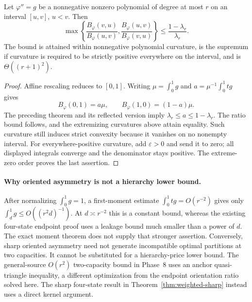 \begin{theorem}
Let $\varphi''=g$ be a nonnegative nonzero polynomial of degree at most
$r$ on an interval $[u,v]$, $u<v$. Then
\begin{equation}
 \max\left\{\frac{B_\varphi(v,u)}{B_\varphi(u,v)},
             \frac{B_\varphi(u,v)}{B_\varphi(v,u)}\right\}
 \le\frac{1-\lambda_r}{\lambda_r}.
 \label{eq:p9-exact-asymmetry}
\end{equation}
The bound is attained within nonnegative polynomial curvature, is the
supremum if curvature is required to be strictly positive everywhere on
the interval, and is $\Theta((r+1)^2)$.
\end{theorem}
\begin{proof}
Affine rescaling reduces to $[0,1]$. Writing
$\mu=\int_0^1g$ and $a=\mu^{-1}\int_0^1tg$ gives
\[
 B_\varphi(0,1)=a\mu,
 \qquad B_\varphi(1,0)=(1-a)\mu.
\]
The preceding theorem and its reflected version imply
$\lambda_r\le a\le1-\lambda_r$. The ratio bound follows, and the
extremizing curvatures above attain equality. Such curvature still
induces strict convexity because it vanishes on no nonempty interval.
For everywhere-positive curvature, add $\varepsilon>0$ and send it to
zero; all displayed integrals converge and the denominator stays positive.
The extreme-zero order proves the last assertion.
\end{proof}

\paragraph{Why oriented asymmetry is not a hierarchy lower bound.}
After normalizing $\int_0^1g=1$, a first-moment estimate
$\int_0^1tg=O(r^{-2})$ gives only
$\int_d^1g\le O((r^2d)^{-1})$. At $d\asymp r^{-2}$ this is a
constant bound, whereas the existing four-state endpoint proof uses a
leakage bound much smaller than a power of $d$. The exact moment theorem
does not supply that stronger assertion. Conversely, sharp oriented
asymmetry need not generate incompatible optimal partitions at two
capacities. It cannot be substituted for a hierarchy-price lower bound.
The general-source $O(r^2)$ two-capacity bound in Phase~8 uses an anchor
quasi-triangle inequality, a different optimization from the endpoint
orientation ratio solved here. The sharp four-state result in
Theorem~\ref{thm:weighted-sharp} instead uses a direct kernel argument.

